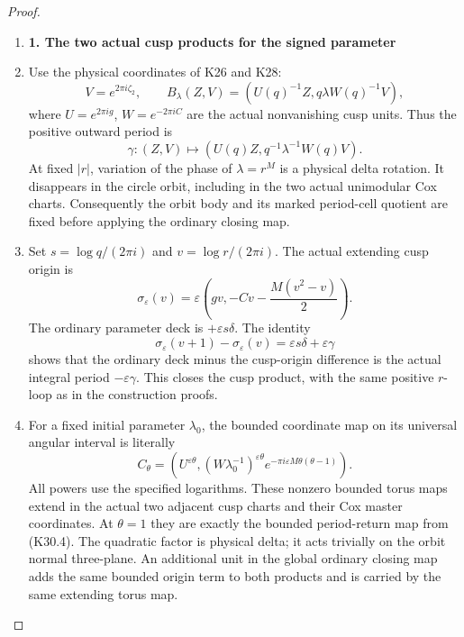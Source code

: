 \begin{proof}
\begin{enumerate}[label=\arabic*.]
\item \par

\medskip\noindent\textbf{1. The two actual cusp products for the signed parameter}

\par\nobreak

\item Use the physical coordinates of K26 and K28:
\[
 V=e^{2\pi i\zeta_2},\qquad
 B_\lambda(Z,V)=(U(q)^{-1}Z,q\lambda W(q)^{-1}V),
\]
where \(U=e^{2\pi i g}\), \(W=e^{-2\pi i C}\) are the actual
nonvanishing cusp units. Thus the positive outward period is
\[
 \gamma:(Z,V)\longmapsto
      (U(q)Z,q^{-1}\lambda^{-1}W(q)V).
 \tag{K30.2}
\]
At fixed \(|r|\), variation of the phase of \(\lambda=r^M\)
is a physical delta rotation. It disappears in the circle orbit,
including in the two actual unimodular Cox charts. Consequently
the orbit body and its marked period-cell quotient are fixed
before applying the ordinary closing map.

\item Set \(s=\log q/(2\pi i)\) and \(v=\log r/(2\pi i)\).
The actual extending cusp origin is
\[
 \sigma_\varepsilon(v)
       =\varepsilon\left(gv,-Cv-\frac{M(v^2-v)}2\right).
 \tag{K30.3}
\]
The ordinary parameter deck is \(+\varepsilon s\delta\).
The identity
\[
 \sigma_\varepsilon(v+1)-\sigma_\varepsilon(v)
            =\varepsilon s\delta+\varepsilon\gamma
 \tag{K30.4}
\]
shows that the ordinary deck minus the cusp-origin difference
is the actual integral period \(-\varepsilon\gamma\).
This closes the cusp product, with the same positive \(r\)-loop
as in the construction proofs.

\item For a fixed initial parameter \(\lambda_0\), the bounded
coordinate map on its universal angular interval is literally
\[
 C_\theta=
 \left(
 U^{\varepsilon\theta},
 (W\lambda_0^{-1})^{\varepsilon\theta}
       e^{-\pi i\varepsilon M\theta(\theta-1)}
 \right).
 \tag{K30.5}
\]
All powers use the specified logarithms. These nonzero bounded
torus maps extend in the actual two adjacent cusp charts and
their Cox master coordinates. At \(\theta=1\) they are exactly
the bounded period-return map from (K30.4). The quadratic
factor is physical delta; it acts trivially on the orbit normal
three-plane. An additional unit in the global ordinary closing
map adds the same bounded origin term to both products and
is carried by the same extending torus map.


\end{enumerate}
\end{proof}

